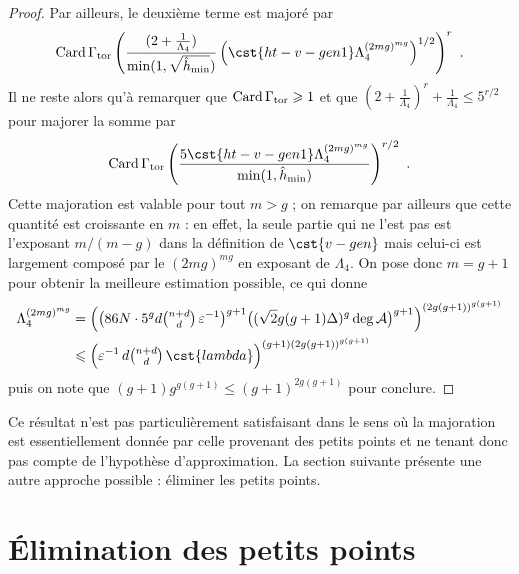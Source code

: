 \begin{proof}
  Par ailleurs, le deuxième terme est majoré par
  \begin{equation}
    \card \Gamma_\torsion
    \left(
      \frac{
        (2 + \frac1{\Lambda_4})
      }{
        \min(1, \sqrt{\hmin})
      }
      \left(
        \cst{ht-v-gen1} \Lambda_4^{(2mg)^{mg}}
      \right)^{1/2}
    \right)^r
    \pmm.
  \end{equation}
  Il ne reste alors qu'à remarquer que \( \operatorname{Card} \Gamma_{\mathrm{tor}} \geqslant 1 \) et
  que \( (2 + \frac1{\Lambda_4})^r + \frac1{\Lambda_4} \le 5^{r/2} \) pour
  majorer la somme par
  \begin{equation}
    \card \Gamma_\torsion
    \left(
      \frac{
        5 \cst{ht-v-gen1} \Lambda_4^{(2mg)^{mg}}
      }{
        \min(1, \hmin)
      }
    \right)^{r/2}
    \pmm.
  \end{equation}
  Cette majoration est valable pour tout \( m > g \) ;
  on remarque par ailleurs que cette quantité est croissante en \( m \) :
  en effet, la seule partie qui ne l'est pas est l'exposant \( m /
    (m - g) \) dans la définition de \( \cst{v-gen} \) mais celui-ci
  est largement composé par le \( (2mg)^{mg} \) en
  exposant de \( \Lambda_4 \).  On pose donc \( m = g + 1 \) pour
  obtenir la meilleure estimation possible, ce qui donne
  \begin{align}
    \Lambda_4^{(2mg)^{mg}}
    & =
    \left(
      \bigl(
        86 \nclmaps \cdot 5^g \adeg \sbin{n + \adeg}{\adeg}
        \, \eps^{-1}
      \bigr)^{ g + 1 }
      \bigl( (\sqrt2 g(g+1)\Delta)^g \deg \va \bigr)^{g+1}
    \right)^{(2g(g+1))^{g(g+1)}}
    \\ & \le
    \Bigl(
      \eps^{-1}
      \, \adeg \sbin{n + \adeg}{\adeg}
      \, \cst{lambda}
    \Bigr)^{(g+1) (2g(g+1))^{g(g+1)}}
  \end{align}
  puis on note que
  \(
    (g+1) g^{g(g+1)}
    \le
    (g+1)^{2g(g+1)}
  \) pour conclure.
\end{proof}

Ce résultat n'est pas particulièrement satisfaisant dans le sens où la
majoration est essentiellement donnée par celle provenant des petits points et
ne tenant donc pas compte de l'hypothèse d'approximation. La section suivante
présente une autre approche possible : éliminer les petits points.



\section{Élimination des petits points}
\label{sec:no-small-points}

